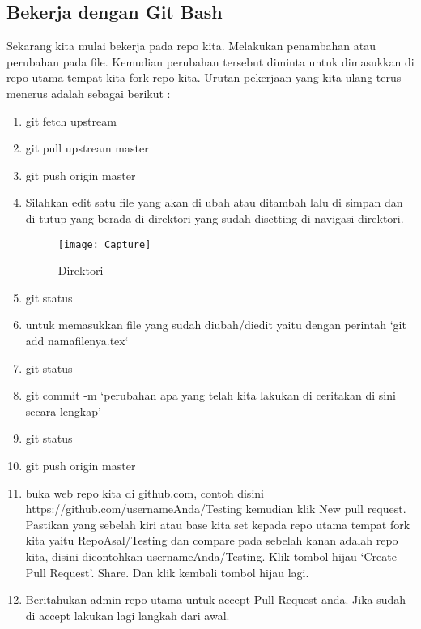 \subsection{Bekerja dengan Git Bash}
Sekarang kita mulai bekerja pada repo kita. Melakukan penambahan atau perubahan pada file. Kemudian perubahan tersebut diminta untuk dimasukkan di repo utama tempat kita fork repo kita. Urutan pekerjaan yang kita ulang terus menerus adalah sebagai berikut :
\begin{enumerate}
\item git fetch upstream
\item git pull upstream master
\item git push origin master
\item Silahkan edit satu file yang akan di ubah atau ditambah lalu di simpan dan di tutup yang berada di direktori yang sudah disetting di navigasi direktori.
    \begin{figure}[!htbp]
        \centering
            \texttt{[image: Capture]}
            \caption{Direktori}
        \label{penanda}
    \end{figure}
\item git status
\item untuk memasukkan file yang sudah diubah/diedit yaitu dengan perintah `git add namafilenya.tex`
\item git status
\item git commit -m `perubahan apa yang telah kita lakukan di ceritakan di sini secara lengkap'
\item git status
\item git push origin master
\item buka web repo kita di github.com, contoh disini https://github.com/usernameAnda/Testing kemudian klik New pull request. Pastikan yang sebelah kiri atau base kita set kepada repo utama tempat fork kita yaitu RepoAsal/Testing dan compare pada sebelah kanan adalah repo kita, disini dicontohkan usernameAnda/Testing. Klik tombol hijau `Create Pull Request'. Share. Dan klik kembali tombol hijau lagi.
\item Beritahukan admin repo utama untuk accept Pull Request anda. Jika sudah di accept lakukan lagi langkah dari awal.
\end{enumerate} 